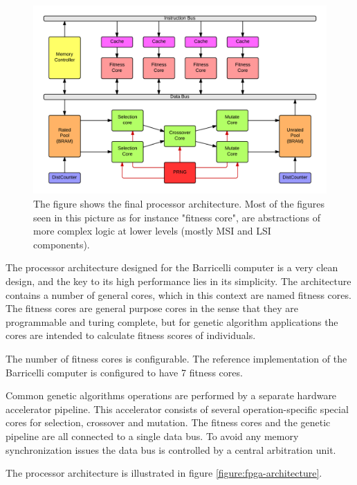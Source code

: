 \begin{figure}[H]
\includegraphics[width=\textwidth]{fpga/fig/processor_architecture.png}
\caption{The figure shows the final processor architecture. Most of the figures seen in this picture as for instance "fitness core", are abstractions of more complex logic at lower levels (mostly MSI and LSI components). }
\label{figure:fpga-architecture}
\end{figure}


The processor architecture designed for the Barricelli computer is a very clean design, and the key to its high performance lies in its simplicity.
The architecture contains a number of general cores, which in this context are named fitness cores.
The fitness cores are general purpose cores in the sense that they are programmable and turing complete, but for genetic algorithm applications the cores are intended to calculate fitness scores of individuals.

The number of fitness cores is configurable.
The reference implementation of the Barricelli computer is configured to have 7 fitness cores.

Common genetic algorithms operations are performed by a separate hardware accelerator pipeline.
This accelerator consists of several operation-specific special cores for selection, crossover and mutation.
The fitness cores and the genetic pipeline are all connected to a single data bus.
To avoid any memory synchronization issues the data bus is controlled by a central arbitration unit.

The processor architecture is illustrated in figure \vref{figure:fpga-architecture}.


